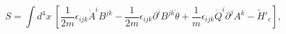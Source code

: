 \begin{equation}
S=\int d^4x~\left[\frac{1}{2m}\epsilon_{ijk}\dot{A}^iB^{jk} -
\frac{1}{2m}\epsilon_{ijk}\partial^iB^{jk}\dot{\theta} +
\frac{1}{m}\epsilon_{ijk}\dot{Q}^i\partial^jA^k - \widetilde{H}'_c
\right],
\end{equation}

